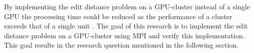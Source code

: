 By implementing the edit distance problem on a GPU-cluster instead of a single GPU the processing time could be reduced as the performance of a cluster exceeds that of a single unit \cite{Cluster}.
The goal of this research is to implement the edit distance problem on a GPU-cluster using MPI and verify this implementation.
This goal results in the research question mentioned in the following section.

